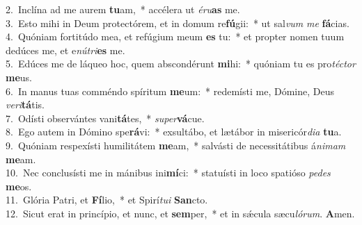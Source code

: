 {2.~}Inclína ad me aurem \textbf{tu}am,~* accélera ut \textit{é}\textit{ru}\textbf{as} me.\\
{3.~}Esto mihi in Deum protectórem, et in domum re\textbf{fú}gii:~* ut sal\textit{vum} \textit{me} \textbf{fá}cias.\\
{4.~}Quóniam fortitúdo mea, et refúgium meum \textbf{es} tu:~* et propter nomen tuum dedúces me, et e\textit{nú}\textit{tri}\textbf{es} me.\\
{5.~}Edúces me de láqueo hoc, quem abscondérunt \textbf{mi}hi:~* quóniam tu es pro\textit{té}\textit{ctor} \textbf{me}us.\\
{6.~}In manus tuas comméndo spíritum \textbf{me}um:~* redemísti me, Dómine, Deus \textit{ve}\textit{ri}\textbf{tá}tis.\\
{7.~}Odísti observántes vani\textbf{tá}tes,~* \textit{su}\textit{per}\textbf{vá}cue.\\
{8.~}Ego autem in Dómino spe\textbf{rá}vi:~* exsultábo, et lætábor in misericór\textit{di}\textit{a} \textbf{tu}a.\\
{9.~}Quóniam respexísti humilitátem \textbf{me}am,~* salvásti de necessitátibus á\textit{ni}\textit{mam} \textbf{me}am.\\
{10.~}Nec conclusísti me in mánibus ini\textbf{mí}ci:~* statuísti in loco spatióso \textit{pe}\textit{des} \textbf{me}os.\\
{11.~}Glória Patri, et \textbf{Fí}lio,~* et Spirí\textit{tu}\textit{i} \textbf{San}cto.\\
{12.~}Sicut erat in princípio, et nunc, et \textbf{sem}per,~* et in sǽcula sæcu\textit{ló}\textit{rum}. \textbf{A}men.\\
